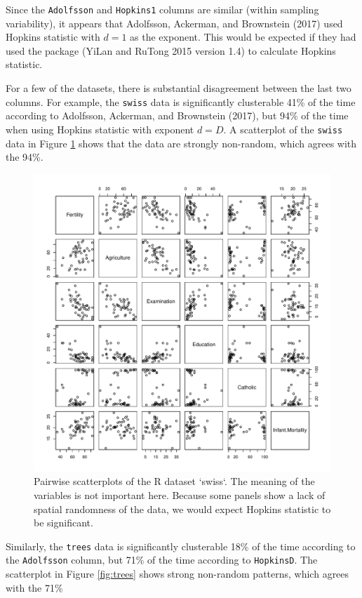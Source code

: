 Since the \texttt{Adolfsson} and \texttt{Hopkins1} columns are similar (within sampling variability), it appears that Adolfsson, Ackerman, and Brownstein (2017) used Hopkins statistic with \(d=1\) as the exponent. This would be expected if they had used the  package (YiLan and RuTong 2015 version 1.4) to calculate Hopkins statistic.

For a few of the datasets, there is substantial disagreement between the last two columns. For example, the \texttt{swiss} data is significantly clusterable 41\% of the time according to Adolfsson, Ackerman, and Brownstein (2017), but 94\% of the time when using Hopkins statistic with exponent \(d=D\). A scatterplot of the \texttt{swiss} data in Figure \ref{fig:swiss} shows that the data are strongly non-random, which agrees with the 94\%.

\begin{figure}

{\centering \includegraphics[width=0.9\linewidth]{RJ-2022-055_files/figure-latex/swiss-1} 

}

\caption{Pairwise scatterplots of the R dataset `swiss`. The meaning of the variables is not important here. Because some panels show a lack of spatial randomness of the data, we would expect Hopkins statistic to be significant.}\label{fig:swiss}
\end{figure}

Similarly, the \texttt{trees} data is significantly clusterable 18\% of the time according to the \texttt{Adolfsson} column, but 71\% of the time according to \texttt{HopkinsD}. The scatterplot in Figure \ref{fig:trees} shows strong non-random patterns, which agrees with the 71\%

